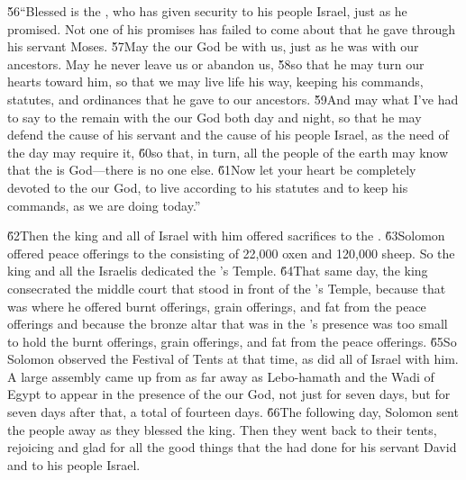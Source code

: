 \begin{poetry}
\poeml \v{56}``Blessed is the , who has given security to his people Israel, just as he promised. Not one of his promises has failed to come about that he gave through his servant Moses. \v{57}May the  our God be with us, just as he was with our ancestors. May he never leave us or abandon us, \v{58}so that he may turn our hearts toward him, so that we may live life his way, keeping his commands, statutes, and ordinances that he gave to our ancestors. \v{59}And may what I've had to say to the  remain with the  our God both day and night, so that he may defend the cause of his servant and the cause of his people Israel, as the need of the day may require it, \v{60}so that, in turn, all the people of the earth may know that the  is God---there is no one else. \v{61}Now let your heart be completely devoted to the  our God, to live according to his statutes and to keep his commands, as we are doing today.''
\end{poetry}

\v{62}Then the king and all of Israel with him offered sacrifices to the . \v{63}Solomon offered peace offerings to the  consisting of 22,000 oxen and 120,000 sheep. So the king and all the Israelis dedicated the 's Temple. \v{64}That same day, the king consecrated the middle court that stood in front of the 's Temple, because that was where he offered burnt offerings, grain offerings, and fat from the peace offerings and because the bronze altar that was in the 's presence was too small to hold the burnt offerings, grain offerings, and fat from the peace offerings. \v{65}So Solomon observed the Festival of Tents at that time, as did all of Israel with him. A large assembly came up from as far away as Lebo-hamath and the Wadi of Egypt to appear in the presence of the  our God, not just for seven days, but for seven days after that, a total of fourteen days. \v{66}The following day, Solomon sent the people away as they blessed the king. Then they went back to their tents, rejoicing and glad for all the good things that the  had done for his servant David and to his people Israel.

